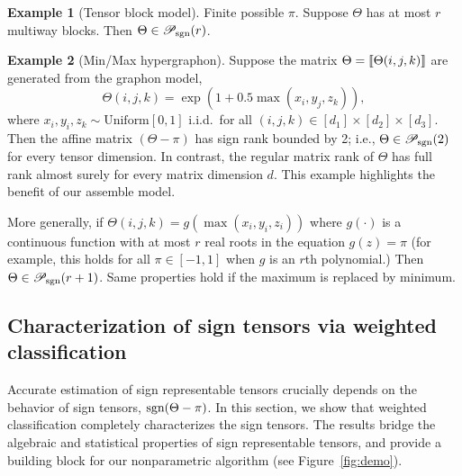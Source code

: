 \documentclass{article}
\theoremstyle{plain}
\newtheorem{prop}{Proposition}
\theoremstyle{definition}
\newtheorem{example}{Example}
\def\sign{\textup{sgn}}
\def\caliP{\mathscr{P}_{\textup{sgn}}}
\begin{document}
\begin{example}[Tensor block model]
Finite possible $\pi$. Suppose $\Theta$ has at most $r$ multiway blocks. Then $\Theta \in \caliP(r)$. 
\end{example}

\begin{example}[Min/Max hypergraphon]
Suppose the matrix $\Theta=\llbracket \Theta(i,j,k) \rrbracket$ are generated from the graphon model,
\[
\Theta(i,j,k)=\exp(1+0.5\max(x_i,y_j,z_k)), 
\]
where $x_i, y_i,z_k \sim \text{Uniform}[0,1]$ i.i.d.\ for all $(i,j,k)\in[d_1]\times[d_2]\times[d_3]$. Then the affine matrix $(\Theta-\pi)$ has sign rank bounded by 2; i.e., $\Theta \in \caliP(2)$ for every tensor dimension. In contrast, the regular matrix rank of $\Theta$ has full rank almost surely for every matrix dimension $d$. This example highlights the benefit of our assemble model. 

More generally, if $\Theta(i,j,k)=g(\max(x_i,y_i,z_i))$ where $g(\cdot)$ is a continuous function with at most $r$ real roots in the equation $g(z)=\pi$ (for example, this holds for all $\pi\in[-1,1]$ when $g$ is an $r$th polynomial.) Then $\Theta \in \caliP(r+1)$. Same properties hold if the maximum is replaced by minimum. 
\end{example}


\subsection{Characterization of sign tensors via weighted classification}

Accurate estimation of sign representable tensors crucially depends on the behavior of sign tensors, $\sign(\Theta-\pi)$. In this section, we show that weighted classification completely characterizes the sign tensors. The results bridge the algebraic and statistical properties of sign representable tensors, and provide a building block for our nonparametric algorithm (see Figure~\ref{fig:demo}).
 
\end{document}
